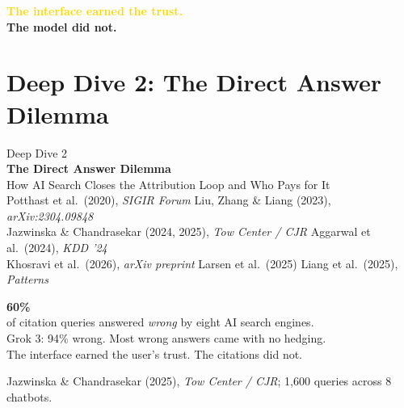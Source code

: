 \documentclass[aspectratio=169,11pt]{beamer}
\begin{document}
{
\begin{frame}[plain]
\vfill
\begin{center}
{\huge\bfseries\textcolor{Gold}{The interface earned the trust.}}\\[0.8cm]
{\huge\bfseries\textcolor{SoftWhite}{The model \alert{did not}.}}
\end{center}
\vfill
\end{frame}}


\section{Deep Dive 2: The Direct Answer Dilemma}

{
\begin{frame}[plain]
\vfill
\begin{center}
{\large\textcolor{WarmGray}{Deep Dive 2}}\\[0.4cm]
{\Huge\bfseries\textcolor{DeepNavy}{The Direct Answer Dilemma}}\\[0.3cm]
{\large\textcolor{WarmGray}{How AI Search Closes the Attribution Loop \textemdash{} and Who Pays for It}}\\[1.0cm]
\footnotesize\textcolor{WarmGray}{%
Potthast et al.\ (2020), \emph{SIGIR Forum} \quad\textbar\quad
Liu, Zhang \& Liang (2023), \emph{arXiv:2304.09848}\\
Jazwinska \& Chandrasekar (2024, 2025), \emph{Tow Center / CJR} \quad\textbar\quad
Aggarwal et al.\ (2024), \emph{KDD '24}\\
Khosravi et al.\ (2026), \emph{arXiv preprint} \quad\textbar\quad
Larsen et al.\ (2025) \quad\textbar\quad
Liang et al.\ (2025), \emph{Patterns}}
\end{center}
\vfill
\end{frame}}

\begin{frame}[plain]
\vfill
\begin{center}
{\Huge\bfseries\textcolor{DeepRed}{60\%}}\\[0.4cm]
{\large\textcolor{DeepNavy}{of citation queries answered \emph{wrong} by eight AI search engines.}}\\[0.2cm]
{\large\textcolor{DeepNavy}{Grok 3: 94\% wrong. Most wrong answers came with no hedging.}}\\[1.0cm]
{\Large\textcolor{WarmGray}{The interface earned the user's trust. The citations did not.}}
\end{center}
\vfill
\begin{flushright}
\scriptsize\textcolor{WarmGray}{Jazwinska \& Chandrasekar (2025), \emph{Tow Center / CJR}; 1{,}600 queries across 8 chatbots.}
\end{flushright}
\end{frame}
\end{document}
